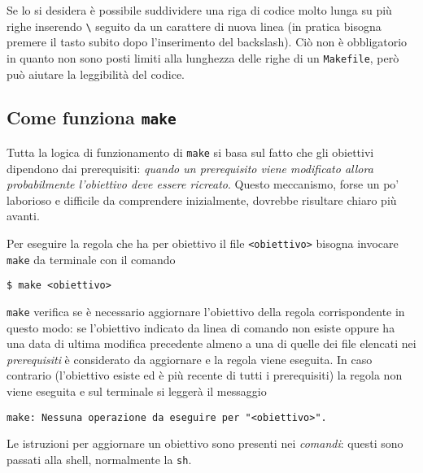 Se lo si desidera è possibile suddividere una riga di codice molto lunga su più
righe inserendo \texttt{\textbackslash{}} seguito da un carattere di nuova linea
(in pratica bisogna premere il tasto  subito dopo l'inserimento del
backslash).  Ciò non è obbligatorio in quanto non sono posti limiti alla
lunghezza delle righe di un \texttt{Makefile}, però può aiutare la leggibilità
del codice.


\subsection{Come funziona \texttt{make}}
\label{sec:come-funziona}

Tutta la logica di funzionamento di \texttt{make} si basa sul fatto che gli
obiettivi dipendono dai prerequisiti:
\emph{quando un prerequisito viene modificato allora probabilmente l'obiettivo
  deve essere ricreato}.
Questo meccanismo, forse un po' laborioso e difficile da comprendere
inizialmente, dovrebbe risultare chiaro più avanti.

Per eseguire la regola che ha per obiettivo il file \texttt{<obiettivo>} bisogna
invocare \texttt{make} da terminale con il comando
\begin{verbatim}
$ make <obiettivo>
\end{verbatim} %
\texttt{make} verifica se è necessario aggiornare l'obiettivo della regola
corrispondente in questo modo: se l'obiettivo indicato da linea di comando non
esiste oppure ha una data di ultima modifica precedente almeno a una di quelle
dei file elencati nei \emph{prerequisiti} è considerato da aggiornare e la
regola viene eseguita.  In caso contrario (l'obiettivo esiste ed è più recente
di tutti i prerequisiti) la regola non viene eseguita e sul terminale si leggerà
il messaggio
\begin{verbatim}
make: Nessuna operazione da eseguire per "<obiettivo>".
\end{verbatim}
Le istruzioni per aggiornare un obiettivo sono
presenti nei \emph{comandi}: questi sono passati alla shell, normalmente la
\texttt{sh}.

